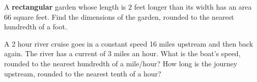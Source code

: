 \vfill
\begin{center} \hfill
\end{center}

\newpage

\begin{exercise}
	A \textbf{rectangular} garden whose length is $2$ feet longer than its width has an area 66 square feet. Find the dimensions of the garden, rounded to the nearest hundredth of a foot.
\end{exercise}

\vfill
\begin{center} \hfill
\end{center}

\begin{exercise}
A 2 hour river cruise goes in a constant speed 16 miles upstream and then back again. The river has a current of 3 miles an hour. What is the boat's speed, rounded to the nearest hundredth of a mile/hour? How long is the journey upstream, rounded to the nearest tenth of a hour?
\end{exercise}

\vfill
\begin{center} \hfill
\end{center}